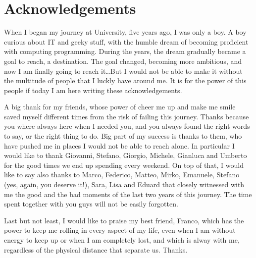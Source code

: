 

\section*{Acknowledgements}

\noindent When I began my journey at University, five years ago, I was only
a boy. A boy curious about IT and geeky stuff, with the humble dream of becoming
proficient with computing programming. During the years, the dream gradually
became a goal to reach, a destination. The goal changed, becoming more
ambitious, and now I am finally going to reach it\dots But I would not be able
to make it without the multitude of people that I luckly have around me. It is
for the power of this people if today I am here writing these acknowledgements.

\vspace{0.3cm}

\noindent A big thank for my friends, whose power of cheer me up and make me
smile saved myself different times from the risk of failing this journey. Thanks
because you where always here when I needed you, and you always found the right
words to say, or the right thing to do. Big part of my success is thanks to
them, who have pushed me in places I would not be able to reach alone. In
particular I would like to thank Giovanni, Stefano, Giorgio, Michele, Gianluca
and Umberto for the good times we end up spending every weekend. On top of that,
I would like to say also thanks to Marco, Federico, Matteo, Mirko, Emanuele,
Stefano (yes, again, you deserve it!), Sara, Lisa and Eduard that closely
witnessed with me the good and the bad moments of the last two years of this
journey. The time spent together with you guys will not be easily forgotten.

\vspace{0.3cm}

\noindent Last but not least, I would like to praise my best friend, Franco,
which has the power to keep me rolling in every aspect of my life, even when I
am without energy to keep up or when I am completely lost, and which is alway
with me, regardless of the physical distance that separate us. Thanks.

\vspace{0.3cm}

